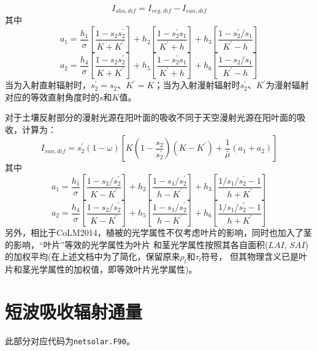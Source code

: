 \begin{equation}
I_{sha,dif}=I_{veg,dif}-I_{sun,dif}
\end{equation}
其中
\begin{equation}
a_{1}=\frac{h_{1}}{\sigma}\left[\frac{1-s_{2} s_{2}^{\prime}}{K+K^{\prime}}\right]+h_{2}\left[\frac{1-s_{2}^{\prime} 
s_{1}}{K^{\prime}+h}\right]+h_{3}\left[\frac{1-s_{2}^{\prime} / s_{1}}{K^{\prime}-h}\right]
\end{equation}
\begin{equation}
a_{2}=\frac{h_{4}}{\sigma}\left[\frac{1-s_{2} s_{2}^{\prime}}{K+K^{\prime}}\right]+h_{5}\left[\frac{1-s_{2}^{\prime} s_{1}}
{K^{\prime}+h}\right]+h_{6}\left[\frac{1-s_{2} / s_{1}}{K^{\prime}-h}\right]
\end{equation}
当为入射直射辐射时，$s_2^\prime=s_2$、$K^\prime=K$；当为入射漫射辐射时$s_2^\prime$、$K^\prime$为漫射辐射对应的等效直射角度时的$s$和$K$值。


对于土壤反射部分的漫射光源在阳叶面的吸收不同于天空漫射光源在阳叶面的吸收，计算为：
\begin{equation}
I_{s u n, dif}=s_{2}^{\prime}(1-\omega)\left[K\left(1-\frac{s_{2}}{s_{2}^{\prime}}\right)
\left(K-K^{\prime}\right)+\frac{1}{\bar{\mu}}\left(a_{1}+a_{2}\right)\right]
\end{equation}
其中
\begin{equation}
a_{1}=\frac{h_{1}}{\sigma}\left[\frac{1-s_{2} / s_{2}^{\prime}}{K-K^{\prime}}\right]+h_{2}\left[\frac{1-s_{1} /
 s_{2}^{\prime}}{h-K^{\prime}}\right]+h_{3}\left[\frac{1 / s_{1} / s_{2}^{\prime}-1}{h+K^{\prime}}\right]
\end{equation}
\begin{equation}
a_{2}=\frac{h_{4}}{\sigma}\left[\frac{1-s_{2} / s_{2}^{\prime}}{K-K^{\prime}}\right]+h_{5}\left[\frac{1-s_{1} / 
s_{2}^{\prime}}{h-K^{\prime}}\right]+h_{6}\left[\frac{1 / s_{1} / s_{2}^{\prime}-1}{h+K^{\prime}}\right]
\end{equation}
另外，相比于CoLM2014，植被的光学属性不仅考虑叶片的影响，同时也加入了茎的影响，“叶片”等效的光学属性为叶片
和茎光学属性按照其各自面积($LAI$, $SAI$)的加权平均(在上述文档中为了简化，保留原来$\rho_l$和$\tau_l$符号，
但其物理含义已是叶片和茎光学属性的加权值，即等效叶片光学属性)。



\section{短波吸收辐射通量}\label{短波吸收辐射通量}
此部分对应代码为\texttt{netsolar.F90}。

